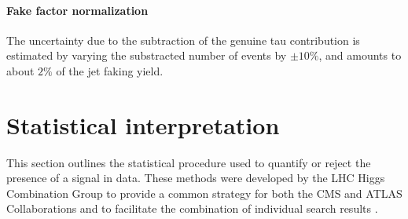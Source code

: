 
\paragraph{Fake factor normalization} The uncertainty due to the subtraction of the genuine tau contribution is estimated by varying the substracted number of events by $\pm 10\%$, and amounts to about $2\%$ of the jet faking \tauh yield. %

\section{Statistical interpretation}
\label{sec:analysis_statistical_interpretation}

This section outlines the statistical procedure used to quantify or reject the presence of a signal in data. These methods were developed by the LHC Higgs Combination Group to provide a common strategy for both the CMS and ATLAS Collaborations and to facilitate the combination of individual search results \cite{CMS-NOTE-2011-005}. 

